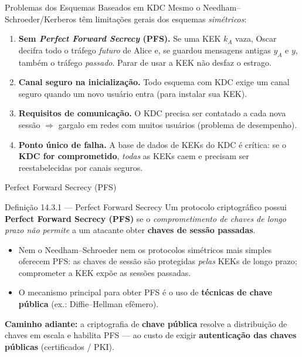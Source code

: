 \documentclass{beamer}
\begin{document}
\begin{frame}{Problemas dos Esquemas Baseados em KDC}
    Mesmo o Needham--Schroeder/Kerberos têm limitações gerais dos esquemas \emph{simétricos}:
    \medskip
    \begin{enumerate}
        \footnotesize
        \item \textbf{Sem \textit{Perfect Forward Secrecy} (PFS).} Se uma KEK $k_A$ vaza, Oscar decifra todo o tráfego \emph{futuro} de Alice e, se guardou mensagens antigas $y_A$ e $y$, também o tráfego \emph{passado}. Parar de usar a KEK não desfaz o estrago.
        \medskip
        \item \textbf{Canal seguro na inicialização.} Todo esquema com KDC exige um canal seguro quando um novo usuário entra (para instalar sua KEK).
        \medskip
        \item \textbf{Requisitos de comunicação.} O KDC precisa ser contatado a cada nova sessão $\Rightarrow$ gargalo em redes com muitos usuários (problema de desempenho).
        \medskip
        \item \textbf{Ponto único de falha.} A base de dados de KEKs do KDC é crítica: se o \textbf{KDC for comprometido}, \emph{todas} as KEKs caem e precisam ser reestabelecidas por canais seguros.
    \end{enumerate}
\end{frame}

\begin{frame}{Perfect Forward Secrecy (PFS)}
    \begin{block}{Definição 14.3.1 --- Perfect Forward Secrecy}
        Um protocolo criptográfico possui \textbf{Perfect Forward Secrecy (PFS)} se o \emph{comprometimento de chaves de longo prazo não permite} a um atacante obter \textbf{chaves de sessão passadas}.
    \end{block}
    \medskip
    \begin{itemize}
        \footnotesize
        \item Nem o Needham--Schroeder nem os protocolos simétricos mais simples oferecem PFS: as chaves de sessão são protegidas \emph{pelas} KEKs de longo prazo; comprometer a KEK expõe as sessões passadas.
        \item O mecanismo principal para obter PFS é o uso de \textbf{técnicas de chave pública} (ex.: Diffie--Hellman efêmero).
    \end{itemize}
    \medskip
    \begin{tcolorbox}[colback=green!5,colframe=green!50!black,boxrule=0.5pt]
        \footnotesize
        \textbf{Caminho adiante:} a criptografia de \textbf{chave pública} resolve a distribuição de chaves em escala e habilita PFS --- ao custo de exigir \textbf{autenticação das chaves públicas} (certificados / PKI).
    \end{tcolorbox}
\end{frame}
\end{document}
